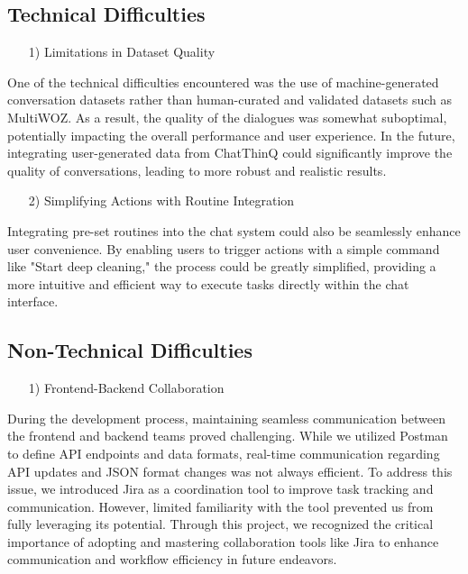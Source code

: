 \documentclass[conference]{IEEEtran}
\begin{document}
\subsection{Technical Difficulties}
\begin{enumerate}
    \item [1)] Limitations in Dataset Quality 
\end{enumerate}
    \hspace{0.3em} One of the technical difficulties encountered was the use of machine-generated conversation datasets rather than human-curated and validated datasets such as MultiWOZ. As a result, the quality of the dialogues was somewhat suboptimal, potentially impacting the overall performance and user experience. In the future, integrating user-generated data from ChatThinQ could significantly improve the quality of conversations, leading to more robust and realistic results. \\
\begin{enumerate}
    \item [2)]  Simplifying Actions with Routine Integration
\end{enumerate}
    \hspace{0.3em} Integrating pre-set routines into the chat system could also be seamlessly enhance user convenience. By enabling users to trigger actions with a simple command like "Start deep cleaning," the process could be greatly simplified, providing a more intuitive and efficient way to execute tasks directly within the chat interface. \\

\subsection{Non-Technical Difficulties}
\begin{enumerate}
    \item [1)] Frontend-Backend Collaboration
\end{enumerate}
    \hspace{0.3em} During the development process, maintaining seamless communication between the frontend and backend teams proved challenging. While we utilized Postman to define API endpoints and data formats, real-time communication regarding API updates and JSON format changes was not always efficient. To address this issue, we introduced Jira as a coordination tool to improve task tracking and communication. However, limited familiarity with the tool prevented us from fully leveraging its potential. Through this project, we recognized the critical importance of adopting and mastering collaboration tools like Jira to enhance communication and workflow efficiency in future endeavors. \\ 
\end{document}
